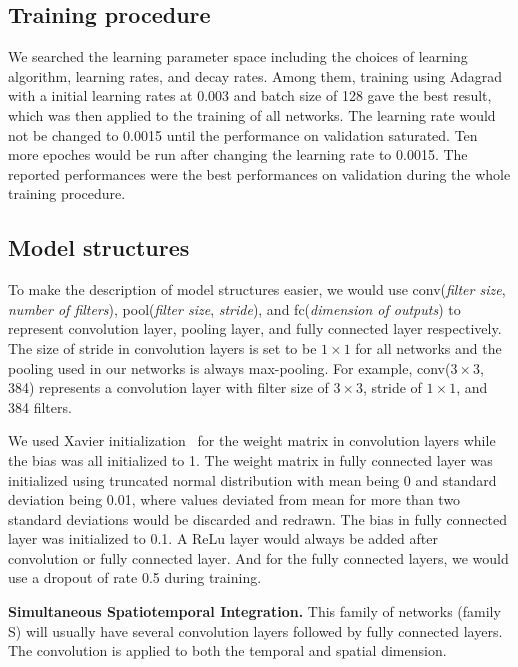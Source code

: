 \subsection{Training procedure}

We searched the learning parameter space including the choices of learning algorithm, learning rates, and decay rates. 
Among them, training using Adagrad~\cite{duchi2011adaptive} with a initial learning rates at 0.003 and batch size of 128 gave the best result, which was then applied to the training of all networks. 
The learning rate would not be changed to 0.0015 until the performance on validation saturated.
Ten more epoches would be run after changing the learning rate to 0.0015.
The reported performances were the best performances on validation during the whole training procedure.

\subsection{Model structures}

To make the description of model structures easier, we would use conv(\textit{filter size}, \textit{number of filters}), pool(\textit{filter size}, \textit{stride}), and fc(\textit{dimension of outputs}) to represent convolution layer, pooling layer, and fully connected layer respectively.
The size of stride in convolution layers is set to be $1\times1$ for all networks and the pooling used in our networks is always max-pooling.
For example, conv($3\times3$, 384) represents a convolution layer with filter size of $3\times3$, stride of $1\times1$, and 384 filters.

We used Xavier initialization~\cite{glorot2010understanding} for the weight matrix in convolution layers while the bias was all initialized to 1.
The weight matrix in fully connected layer was initialized using truncated normal distribution with mean being 0 and standard deviation being 0.01, where values deviated from mean for more than two standard deviations would be discarded and redrawn.
The bias in fully connected layer was initialized to 0.1.
A ReLu layer would always be added after convolution or fully connected layer.
And for the fully connected layers, we would use a dropout of rate 0.5 during training.~\cite{Krizhevsky} 

\textbf{Simultaneous Spatiotemporal Integration.}
This family of networks (family S) will usually have several convolution layers followed by fully connected layers. The convolution is applied to both the temporal and spatial dimension.

